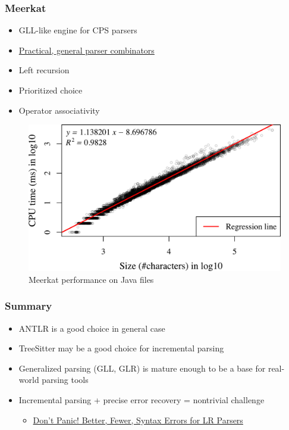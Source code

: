 \documentclass[xcolor=table,aspectratio=169]{beamer}
\begin{document}
\begin{frame}[fragile]
  \frametitle{Meerkat}
  \begin{minipage}[t]{0.4\textwidth}
  \begin{itemize}
    \item GLL-like engine for CPS parsers
    \item \href{https://dl.acm.org/doi/10.1145/2847538.2847539}{Practical, general parser combinators}
    \item[\faPlus] Left recursion
    \item[\faPlus] Prioritized choice
    \item[\faPlus] Operator associativity 
  \end{itemize} 
\end{minipage}  
  \begin{minipage}[t]{0.58\textwidth}
    \begin{figure}
      \includegraphics[width=\textwidth]{pictures/meerkatPerformance.pdf}
      \caption{Meerkat performance on Java files\footnotemark}
    \end{figure}
  \end{minipage}  
\end{frame}

\begin{frame}[fragile]
  \frametitle{Summary}  
  \begin{itemize}
    \item ANTLR is a good choice in general case
    \item TreeSitter may be a good choice for incremental parsing
    \item Generalized parsing (GLL, GLR) is mature enough to be a base for real-world parsing tools
    \item Incremental parsing + precise error recovery = nontrivial challenge    
      \begin{itemize}
    \item \href{https://arxiv.org/pdf/1804.07133.pdf}{Don’t Panic! Better, Fewer, Syntax Errors for LR Parsers}
  \end{itemize} 

  \end{itemize}
\end{frame}
\end{document}
